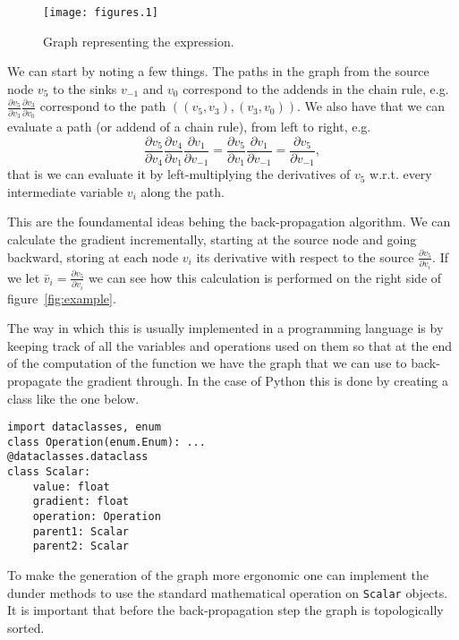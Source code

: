 \documentclass{article}
\newcommand{\partialfrac}[2]{\frac{\partial #1}{\partial #2}}
\begin{document}
\begin{figure}
\centering
\texttt{[image: figures.1]}
\label{fig:dag}
\caption{Graph representing the expression.}
\end{figure}

We can start by noting a few things. The paths in the graph from the source
node \(v_5\)
to the sinks \(v_{-1}\) and \(v_0\) correspond to the addends in the chain
rule, e.g.
\(\partialfrac{v_5}{v_3}\partialfrac{v_3}{v_0}\) correspond to the path
\(((v_5,v_3), (v_3,v_0)).\) We also have that we can evaluate a path (or addend
of a chain rule), from left to right, e.g. \[
\partialfrac{v_5}{v_4}\partialfrac{v_4}{v_1}\partialfrac{v_1}{v_{-1}}
= \partialfrac{v_5}{v_1}\partialfrac{v_1}{v_{-1}}
= \partialfrac{v_5}{v_{-1}},\]
that is we can evaluate it by left-multiplying the derivatives of \(v_5\)
w.r.t. every intermediate variable \(v_i\) along the path.

This are the foundamental ideas behing the back-propagation algorithm. We
can calculate the gradient incrementally, starting at the source node and going
backward, storing at each node \(v_i\) its derivative with respect to the
source \(\partialfrac{v_5}{v_i}.\)
If we let \(\bar v_i = \partialfrac{v_5}{v_i}\) we can see how this calculation
is performed on the right side of figure~\ref{fig:example}.
\iffalse
One important thing to node is that we have
to initialize the gradient stored at every node to 0 and then accumulate the
result for every path that goes through it. So every node \(i\), that
calculates a function \(f_i,\) receives the gradient from one of its ascendants
node \(j\) and has to propagate back to its descendants by accumulating\dots
\fi

The way in which this is usually implemented in a programming language is by
keeping track of all the variables and operations used on them so that at the
end of the computation of the function we have the graph that we can use to
back-propagate the gradient through. In the case of Python this is done by
creating a class like the one below.

\begin{verbatim}
import dataclasses, enum
class Operation(enum.Enum): ...
@dataclasses.dataclass
class Scalar:
    value: float
    gradient: float
    operation: Operation
    parent1: Scalar
    parent2: Scalar
\end{verbatim}

To make the generation of the graph more ergonomic one can implement the dunder
methods to use the standard mathematical operation on \texttt{Scalar} objects.
It is important that before the back-propagation step the graph is
topologically sorted.
\end{document}
